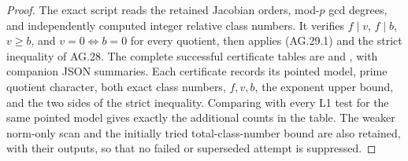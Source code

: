 \begin{proof}
The exact script 
reads the retained Jacobian orders, mod-$p$ gcd degrees,
and independently computed integer relative class numbers.
It verifies $f\mid v$, $f\mid b$, $v\ge b$, and
$v=0\Longleftrightarrow b=0$ for every quotient,
then applies (AG.29.1) and the strict inequality of AG.28.
The complete successful certificate tables are
and
,
with companion JSON summaries. Each certificate records
its pointed model, prime quotient character, both exact
class numbers, $f,v,b$, the exponent upper bound,
and the two sides of the strict inequality. Comparing
with every L1 test for the same pointed model gives
exactly the additional counts in the table. The weaker
norm-only scan and the initially tried total-class-number
bound are also retained, with their outputs, so that no
failed or superseded attempt is suppressed.
\end{proof}


